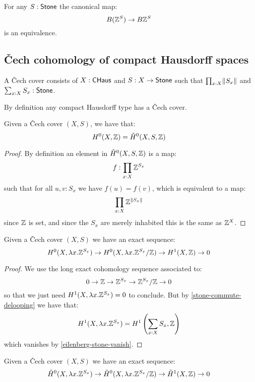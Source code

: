 \begin{corollary}\label{stone-commute-delooping}
For any $S:\mathsf{Stone}$ the canonical map:
\[B(\mathbb{Z}^S) \to B\mathbb{Z}^S\]
is an equivalence.
\end{corollary}


\subsection{\v{C}ech cohomology of compact Hausdorff spaces}

\begin{definition}
A \v{C}ech cover consists of $X:\mathsf{CHaus}$ and $S:X\to\mathsf{Stone}$ such that $\prod_{x:X}\lVert S_x \rVert$ and $\sum_{x:X}S_x:\mathsf{Stone}$.
\end{definition}

By definition any compact Hausdorff type has a \v{C}ech cover.

\begin{lemma}\label{cech-eilenberg-0-agree}
Given a \v{C}ech cover $(X,S)$, we have that:
\[H^0(X,\mathbb{Z}) = \check{H}^0(X,S,\mathbb{Z})\]
\end{lemma}

\begin{proof}
By definition an element in $\check{H}^0(X,S,\mathbb{Z})$ is a map:
\[f:\prod_{x:X}\mathbb{Z}^{S_x}\]
such that for all $u,v:S_x$ we have $f(u)=f(v)$, which is equivalent to a map:
\[\prod_{x:X}\mathbb{Z}^{\lVert S_x \rVert}\]
since $\mathbb{Z}$ is set, and since the $S_x$ are merely inhabited this is the same as $\mathbb{Z}^X$.
\end{proof}

\begin{lemma}\label{eilenberg-exact}
Given a \v{C}ech cover $(X,S)$ we have an exact sequence:
\[H^0(X,\lambda x.\mathbb{Z}^{S_x}) \to H^0(X,\lambda x.\mathbb{Z}^{S_x}/\mathbb{Z}) \to H^1(X,\mathbb{Z})\to 0\]
\end{lemma}

\begin{proof}
We use the long exact cohomology sequence associated to:
\[0 \to \mathbb{Z} \to \mathbb{Z}^{S_x} \to \mathbb{Z}^{S_x}/\mathbb{Z}\to 0\]
so that we just need $H^1(X,\lambda x.\mathbb{Z}^{S_x}) = 0$ to conclude. But by \cref{stone-commute-delooping} we have that:
\[H^1(X,\lambda x.\mathbb{Z}^{S_x}) = H^1\left(\sum_{x:X}S_x,\mathbb{Z}\right)\]
which vanishes by \cref{eilenberg-stone-vanish}.
\end{proof}

\begin{lemma}\label{cech-exact}
Given a \v{C}ech cover $(X,S)$ we have an exact sequence:
\[\check{H}^0(X,\lambda x.\mathbb{Z}^{S_x}) \to \check{H}^0(X,\lambda x.\mathbb{Z}^{S_x}/\mathbb{Z}) \to \check{H}^1(X,\mathbb{Z})\to 0\]
\end{lemma}

